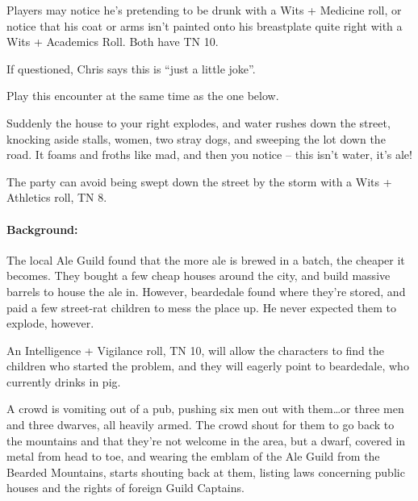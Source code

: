 \begin{multicols}{2}
Players may notice he's pretending to be drunk with a Wits + Medicine roll, or notice that his coat or arms isn't painted onto his breastplate quite right with a Wits + Academics Roll.  Both have TN 10.



If questioned, Chris says this is ``just a little joke''.


Play this encounter at the same time as the one below.

\begin{boxtext}
	Suddenly the house to your right explodes, and water rushes down the street, knocking aside stalls, women, two stray dogs, and sweeping the lot down the road.  It foams and froths like mad, and then you notice -- this isn't water, it's ale!
\end{boxtext}

The party can avoid being swept down the street by the storm with a Wits + Athletics roll, TN 8.

\paragraph{Background:} The local Ale Guild found that the more ale is brewed in a batch, the cheaper it becomes.  They bought a few cheap houses around the city, and build massive barrels to house the ale in.  However, \gls{beardedale} found where they're stored, and paid a few street-rat children to mess the place up.  He never expected them to explode, however.

An Intelligence + Vigilance roll, TN 10, will allow the characters to find the children who started the problem, and they will eagerly point to \gls{beardedale}, who currently drinks in \gls{pig}.



\begin{boxtext}
	A crowd is vomiting out of a pub, pushing six men out with them\ldots or three men and three dwarves, all heavily armed.  The crowd shout for them to go back to the mountains and that they're not welcome in the area, but a dwarf, covered in metal from head to toe, and wearing the emblam of the Ale Guild from the Bearded Mountains, starts shouting back at them, listing laws concerning public houses and the rights of foreign Guild Captains.


\end{boxtext}
\end{multicols}
